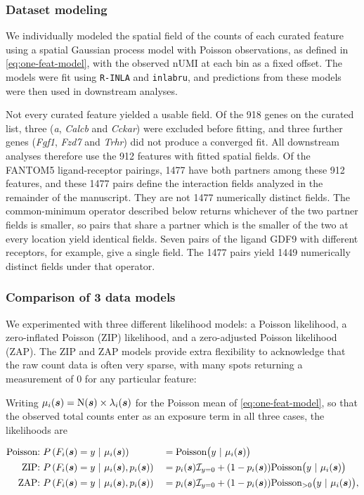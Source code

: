 \documentclass[10pt,letterpaper]{article}
\begin{document}
\subsubsection*{Dataset modeling}\label{sec:meth-models}

We individually modeled the spatial field of the counts of each curated feature using a spatial Gaussian process model with Poisson observations, as defined in \eqref{eq:one-feat-model}, with the observed nUMI at each bin as a fixed offset. The models were fit using \texttt{R-INLA} and \texttt{inlabru}, and predictions from these models were then used in downstream analyses.

Not every curated feature yielded a usable field. Of the 918 genes on the curated list, three (\textit{a}, \textit{Calcb} and \textit{Cckar}) were excluded before fitting, and three further genes (\textit{Fgf1}, \textit{Fzd7} and \textit{Trhr}) did not produce a converged fit. All downstream analyses therefore use the 912 features with fitted spatial fields. Of the FANTOM5 ligand-receptor pairings, 1477 have both partners among these 912 features, and these 1477 pairs define the interaction fields analyzed in the remainder of the manuscript. They are not 1477 numerically distinct fields. The common-minimum operator described below returns whichever of the two partner fields is smaller, so pairs that share a partner which is the smaller of the two at every location yield identical fields. Seven pairs of the ligand GDF9 with different receptors, for example, give a single field. The 1477 pairs yield 1449 numerically distinct fields under that operator.

\subsubsection*{Comparison of 3 data models}\label{sec:meth-model-comp}

We experimented with three different likelihood models: a Poisson likelihood, a zero-inflated Poisson (ZIP) likelihood, and a zero-adjusted Poisson likelihood (ZAP). The ZIP and ZAP models provide extra flexibility to acknowledge that the raw count data is often very sparse, with many spots returning a measurement of 0 for any particular feature:

Writing $\mu_i(\mbox{\boldmath $s$}) = \mbox{N}(\mbox{\boldmath $s$})\times\lambda_i(\mbox{\boldmath $s$})$ for the Poisson mean of \eqref{eq:one-feat-model}, so that the observed total counts enter as an exposure term in all three cases, the likelihoods are

\begin{equation}\label{eq:three-lik}
\begin{aligned}
    \mbox{Poisson:}\  &P\left(F_i(\mbox{\boldmath $s$})=y\ |\ \mu_i(\mbox{\boldmath $s$})\right) &&= \mbox{Poisson}\big(y\ |\ \mu_i(\mbox{\boldmath $s$})\big)\\
    \mbox{ZIP:}\  &P\left(F_i(\mbox{\boldmath $s$}) = y\ |\ \mu_i(\mbox{\boldmath $s$}), p_i(\mbox{\boldmath $s$})\right) &&= p_i(\mbox{\boldmath $s$})\mathcal{I}_{y=0}  + (1-p_i(\mbox{\boldmath $s$}))\mbox{Poisson}\big(y\ |\  \mu_i(\mbox{\boldmath $s$})\big) \\
    \mbox{ZAP:}\  &P\left(F_i(\mbox{\boldmath $s$})= y\ |\ \mu_i(\mbox{\boldmath $s$}), p_i(\mbox{\boldmath $s$})\right) &&= p_i(\mbox{\boldmath $s$})\mathcal{I}_{y=0}  + (1-p_i(\mbox{\boldmath $s$})) \mbox{Poisson}_{>0}\big(y\ |\  \mu_i(\mbox{\boldmath $s$})\big),
\end{aligned}
\end{equation}
\end{document}
